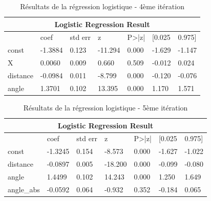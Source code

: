 \documentclass[12pt]{article}
\begin{document}
\begin{table}[htp]
    \centering
    \begin{tabular}{lllllll}
        \multicolumn{7}{c}{\textbf{Logistic Regression Result}}                           \\ \hline
                 & coef    & std err & z       & P\textgreater{}|z| & {[}0.025 & 0.975{]} \\ \hline
        const    & -1.3884 & 0.123   & -11.294 & 0.000              & -1.629   & -1.147   \\
        X        & 0.0060  & 0.009   & 0.660   & 0.509              & -0.012   & 0.024    \\
        distance & -0.0984 & 0.011   & -8.799  & 0.000              & -0.120   & -0.076   \\
        angle    & 1.3701  & 0.102   & 13.395  & 0.000              & 1.170    & 1.571    \\ \hline
    \end{tabular}
    \caption{Résultats de la régression logistique - 4ème itération}
    \label{tab:logistic_regression_result_4}
\end{table}

\begin{table}[htp]
    \centering
    \begin{tabular}{lllllll}
        \multicolumn{7}{c}{\textbf{Logistic Regression Result}}                             \\ \hline
                   & coef    & std err & z       & P\textgreater{}|z| & {[}0.025 & 0.975{]} \\ \hline
        const      & -1.3245 & 0.154   & -8.573  & 0.000              & -1.627   & -1.022   \\
        distance   & -0.0897 & 0.005   & -18.200 & 0.000              & -0.099   & -0.080   \\
        angle      & 1.4499  & 0.102   & 14.243  & 0.000              & 1.250    & 1.649    \\
        angle\_abs & -0.0592 & 0.064   & -0.932  & 0.352              & -0.184   & 0.065    \\ \hline
    \end{tabular}
    \caption{Résultats de la régression logistique - 5ème itération}
    \label{tab:logistic_regression_result_5}
\end{table}
\end{document}
